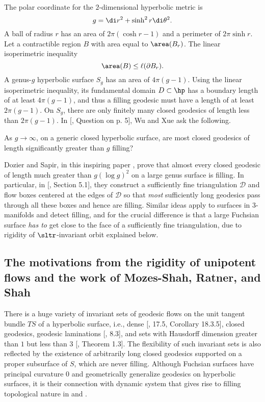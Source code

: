 The polar coordinate for the $2$-dimensional hyperbolic metric is 
$$g=\di r^2 +\sinh^2 r \di \theta^2.$$
A ball of radius $r$ has an area of $2\pi (\cosh r-1)$ and a perimeter of $2\pi \sinh r$. Let a contractible region $B$ with area equal to $\area(B_r)$. The linear isoperimetric inequality 
$$ \area(B) \leq  \ell (\partial B_r).$$
 A genus-$g$ hyperbolic surface $S_g$ has an area of $4\pi(g-1)$. Using the linear isoperimetric inequality, its fundamental domain $D\subset \hp$ has a boundary length of at least $4\pi(g-1)$, and thus a filling geodesic must have a length of at least $2\pi(g-1)$. On $S_g$, there are only finitely many closed geodesics of length less than $2\pi(g-1)$. In [, Question on p. 5], Wu and Xue ask the following.  
\begin{q}
	As $g \rightarrow \infty$, on a generic closed hyperbolic surface, are
	most closed geodesics of length significantly greater than $g$ filling?
\end{q}
Dozier and Sapir, in this inspiring paper \cite{dsCountingGeodesics}, prove that almost every closed geodesic of length much greater than $g(\log g)^2$ on a large genus surface is filling. In particular, in [, Section 5.1], they construct a sufficiently fine triangulation $\mathcal{D}$ and flow boxes centered at the edges of $\mathcal{D}$ so that \textit{most} sufficiently long geodesics pass through all these boxes and hence are filling. Similar ideas apply to surfaces in $3$-manifolds and detect filling, and for  the crucial difference is that a large Fuchsian surface \textit{has to} get close to the face of a sufficiently fine triangulation, due to rigidity of $\sltr$-invariant orbit explained below. 

\subsection{The motivations from the rigidity of unipotent flows and the work of Mozes-Shah, Ratner, and Shah}\label{motivationRatner}
There is a huge variety of invariant sets of geodesic flows on the unit tangent bundle $TS$ of a hyperbolic surface, i.e., dense [, 17.5, Corollary 18.3.5], closed geodesics, geodesic laminations [, 8.3], and sets with Hausdorff dimension greater than $1$ but less than $3$ [, Theorem 1.3]. The flexibility of such invariant sets is also reflected by the existence of arbitrarily long closed geodesics supported on a proper subsurface of $S$, which are never filling. Although Fuchsian surfaces have principal curvature $0$ and geometrically generalize geodesics on hyperbolic surfaces, it is their connection with dynamic system that gives rise to filling topological nature in  and . 

